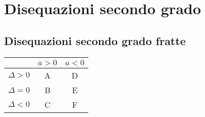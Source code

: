 \chapter{Disequazioni secondo grado}
\section{Disequazioni secondo grado fratte}
{\centering \begin{tabular}{ccc}
\toprule
	& $a>0$ &  $a<0$\\ 
	\midrule
$\Delta >0$	& A  & D \\ 
$\Delta=0$	& B & E \\ 
$\Delta<0$	& C &  F\\ 
\bottomrule
\end{tabular}\par }


